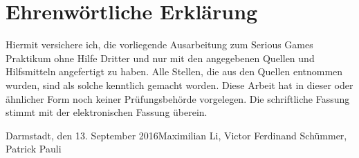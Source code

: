 \documentclass[longdoc,accentcolor=tud0a,12pt,paper=a4,oneside]{tudreport}
\title{\komTitle}
\subtitle{\komThesisType}
\newcounter{dummy} %
\newcommand{\komThesisType}{Ausarbeitung zum Serious Games Praktikum\xspace}
\newcommand{\komName}{Maximilian Li, Victor Ferdinand Schümmer, Patrick Pauli\xspace}
\newcommand{\komSubmissionDate}{13. September 2016\xspace}%
\begin{document}
	\frenchspacing
	\raggedbottom
	\maketitle
	
	\chapter*{Ehrenw\"ortliche Erkl\"arung}
	Hiermit versichere ich, die vorliegende \komThesisType ohne Hilfe Dritter und nur mit den angegebenen Quellen
    und Hilfsmitteln angefertigt zu haben. Alle Stellen, die aus den Quellen entnommen wurden, sind als solche
    kenntlich gemacht worden. Diese Arbeit hat in dieser oder \"ahnlicher Form noch keiner Pr\"ufungsbeh\"orde vorgelegen.
    Die schriftliche Fassung stimmt mit der elektronischen Fassung \"uberein.
    
	
	\vspace{1.5cm}
	
	\noindent Darmstadt, den \komSubmissionDate\hfill \komName
	
	\tableofcontents
	
	\cleardoublepage
	
	
\end{document}
